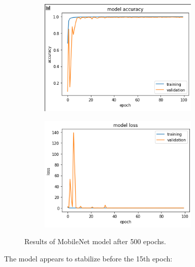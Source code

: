 \documentclass{article}
\begin{document}
\begin{figure}[H]
\centering
\begin{subfigure}
  \centering
  \includegraphics[width=3in]{csci-8920/hw-3/images/mnet_100_epoch.png}
  \label{fig:m-accuracy}
\end{subfigure}%
\begin{subfigure}
  \centering
  \includegraphics[width=3in]{csci-8920/hw-3/images/mnet_loss_100.png}
  \label{fig:m-loss}
\end{subfigure}
\caption{Results of MobileNet model after 500 epochs.}
\label{fig:m-default}
\end{figure}

The model appears to stabilize before the 15th epoch:
\end{document}
